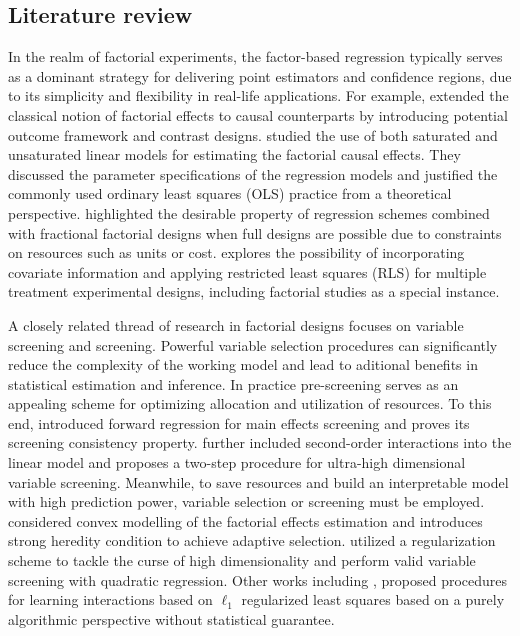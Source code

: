 \documentclass[12pt]{article}
\begin{document}

\subsection{Literature review}
In the realm of factorial experiments, the factor-based regression typically serves as a dominant strategy for delivering point estimators and confidence regions, due to its simplicity and flexibility in real-life applications. For example, \cite{dasgupta2015causal} extended the classical notion of factorial effects to causal counterparts by introducing potential outcome framework and contrast designs.  \cite{zhao2021regression} studied the use of both saturated and unsaturated linear models for estimating the factorial causal effects. They discussed the parameter specifications of the regression models and  justified the commonly used ordinary least squares (OLS) practice from a theoretical perspective.  \cite{pashley2019causal} highlighted the desirable property of regression schemes combined with fractional factorial designs when full designs are possible due to constraints on resources such as units or cost. \cite{zhao2021covariate} explores the possibility of incorporating covariate information and applying restricted least squares (RLS) for multiple treatment experimental designs, including factorial studies as a special instance. 

A closely related thread of research in factorial designs focuses on variable screening and  screening. Powerful variable selection procedures can significantly reduce the complexity of the working model and lead to aditional benefits in statistical estimation and inference. In practice pre-screening serves as an appealing scheme for optimizing allocation and utilization of resources. To this end, \cite{wang2009forward} introduced forward regression for main effects screening and proves its screening consistency property. \cite{hao2014interaction} further included second-order interactions into the linear model and proposes a two-step procedure for ultra-high dimensional variable screening. Meanwhile, to save resources and build an interpretable model with high prediction power, variable selection or screening must be employed. \cite{haris2016convex} considered convex modelling of the factorial effects estimation and introduces strong heredity condition to achieve adaptive selection.  \cite{hao2018model} utilized a regularization scheme to tackle the curse of high dimensionality and perform valid variable screening with quadratic regression. Other works including \cite{lim2015learning, bien2013lasso}, proposed procedures for learning interactions based on $\ell_1$ regularized least squares based on a purely algorithmic perspective without statistical guarantee.
\end{document}
